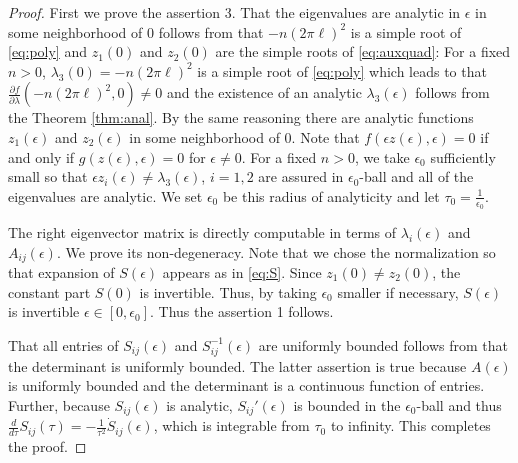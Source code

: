 \documentclass[a4paper,11pt]{article}
\def\l{(2\pi \ell)}
\theoremstyle{remark}
\begin{document}
\begin{proof}
 First we prove the assertion 3. That the eigenvalues are analytic in $\epsilon$ in some neighborhood of $0$ follows from that $-n\l^2$ is a simple root of \eqref{eq:poly} and $z_1(0)$ and $z_2(0)$ are the simple roots of \eqref{eq:auxquad}: For a fixed $n>0$, $\lambda_3(0)= -n\l^2$ is a simple root of \eqref{eq:poly} which leads to that $\frac{\partial f}{\partial \lambda}(-n\l^2,0)\ne 0$ and the existence of an analytic $\lambda_3(\epsilon)$ follows from the Theorem \ref{thm:anal}. By the same reasoning there are analytic functions $z_1(\epsilon)$ and $z_2(\epsilon)$ in some neighborhood of $0$. Note that $f(\epsilon z(\epsilon),\epsilon)=0$ if and only if $g(z(\epsilon),\epsilon)=0$ for $\epsilon\ne0$. For a fixed $n>0$, we take $\epsilon_0$ sufficiently small so that $\epsilon z_i(\epsilon)\ne \lambda_3(\epsilon)$, $i=1,2$ are assured in $\epsilon_0$-ball and all of the eigenvalues are analytic. We set $\epsilon_0$ be this radius of analyticity and let $\tau_0 = \frac{1}{\epsilon_0}$.

 The right eigenvector matrix is directly computable in terms of $\lambda_i(\epsilon)$ and $A_{ij}(\epsilon)$. We prove its non-degeneracy. Note that we chose the normalization so that expansion of $S(\epsilon)$ appears as in \eqref{eq:S}. Since $z_1(0)\ne z_2(0)$, the constant part $S(0)$ is invertible. Thus, by taking $\epsilon_0$ smaller if necessary, $S(\epsilon)$ is invertible $\epsilon\in[0,\epsilon_0]$. Thus the assertion 1 follows.

 That all entries of $S_{ij}(\epsilon)$ and $S^{-1}_{ij}(\epsilon)$ are uniformly bounded follows from that the determinant is uniformly bounded. The latter assertion is true because $A(\epsilon)$ is uniformly bounded and the determinant is a continuous function of entries. Further, because $S_{ij}(\epsilon)$ is analytic, $S_{ij}'(\epsilon)$ is bounded in the $\epsilon_0$-ball and thus $\frac{d}{d\tau} S_{ij}(\tau) = -\frac{1}{\tau^2}\dot S_{ij}(\epsilon)$, which is integrable from $\tau_0$ to infinity. This completes the proof.
\end{proof}
\end{document}
